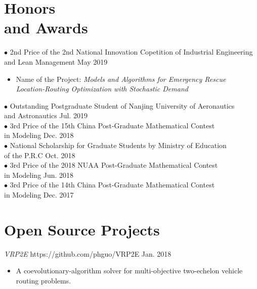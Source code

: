 \documentclass[margin]{res}
\begin{document}
\begin{resume}
\section{\sc Honors \\and Awards}
$\bullet$ 2nd Price of the 2nd National Innovation Copetition of Industrial Engineering\\ and Lean Management \hfill May 2019 
\begin{itemize}  \itemsep -2pt  %
\item Name of the Project: \textit{Models and Algorithms for Emergency Rescue \\Location-Routing Optimization with Stochastic Demand}
\end{itemize} \vspace{-1em}
$\bullet$ Outstanding Postgraduate Student of Nanjing University of Aeronautics \\and Astronautics \hfill Jul. 2019\\
$\bullet$ 3rd Price of the 15th China Post-Graduate Mathematical Contest \\in Modeling \hfill Dec. 2018\\
$\bullet$ National Scholarship for Graduate Students by Ministry of Education \\of the P.R.C \hfill Oct. 2018\\
$\bullet$ 3rd Price of the 2018 NUAA Post-Graduate Mathematical Contest \\in Modeling \hfill Jun. 2018\\
$\bullet$ 3rd Price of the 14th China Post-Graduate Mathematical Contest \\in Modeling \hfill Dec. 2017


\section{\sc Open Source Projects} 
\textit{VRP2E } https://github.com/phguo/VRP2E \hfill Jan. 2018
\begin{itemize} \itemsep -2pt
\item A coevolutionary-algorithm solver for multi-objective two-echelon vehicle routing problems.
\end{itemize}


\end{resume} 
\end{document}
